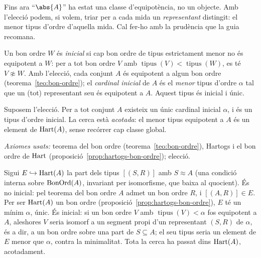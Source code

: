 Fins ara \enquote{\(\abs{A}\)} ha estat una classe d'equipotència, no un
objecte. Amb l'elecció podem, si volem, triar per a cada mida un
\emph{representant} distingit: el menor tipus d'ordre d'aquella mida. Cal
fer-ho amb la prudència que la guia recomana.

\begin{definicio}\label{def:cardinal-inicial}
Un bon ordre \(W\) és \emph{inicial} si cap bon ordre de tipus estrictament
menor no és equipotent a \(W\): per a tot bon ordre \(V\) amb
\(\operatorname{tipus}(V)<\operatorname{tipus}(W)\), es té \(V\not\approx W\).
Amb l'elecció, cada conjunt \(A\) és equipotent a algun bon ordre
(teorema~\ref{teo:bon-ordre}); el \emph{cardinal inicial} de \(A\) és el
\emph{menor} tipus d'ordre \(\alpha\) tal que un (tot) representant seu és
equipotent a \(A\). Aquest tipus és inicial i únic.
\end{definicio}

\begin{proposicio}\label{prop:cardinal-inicial}
Suposem l'elecció. Per a tot conjunt \(A\) existeix un únic cardinal inicial
\(\alpha\), i és un tipus d'ordre inicial. La cerca està \emph{acotada}: el
menor tipus equipotent a \(A\) és un element de \(\operatorname{Hart}(A)\), sense recórrer
cap classe global.\par
\emph{Axiomes usats:} teorema del bon ordre (teorema~\ref{teo:bon-ordre}),
Hartogs i el bon ordre de \(\operatorname{Hart}\) (proposició~\ref{prop:hartogs-bon-ordre});
elecció.
\end{proposicio}

\begin{prova}
Sigui \(E\hookrightarrow\operatorname{Hart}(A)\) la part dels tipus \([(S,R)]\) amb
\(S\approx A\) (una condició interna sobre \(\operatorname{BonOrd}(A)\), invariant per
isomorfisme, que baixa al quocient). És no inicial: pel teorema del bon ordre
\(A\) admet un bon ordre \(R\), i \([(A,R)]\in E\). Per ser \(\operatorname{Hart}(A)\) un bon
ordre (proposició~\ref{prop:hartogs-bon-ordre}), \(E\) té un mínim \(\alpha\),
únic. És inicial: si un bon ordre \(V\) amb \(\operatorname{tipus}(V)<\alpha\)
fos equipotent a \(A\), aleshores \(V\) seria isomorf a un segment propi d'un
representant \((S,R)\) de \(\alpha\), és a dir, a un bon ordre sobre una part
de \(S\subseteq A\); el seu tipus seria un element de \(E\) menor que
\(\alpha\), contra la minimalitat. Tota la cerca ha passat dins \(\operatorname{Hart}(A)\),
acotadament.
\end{prova}

